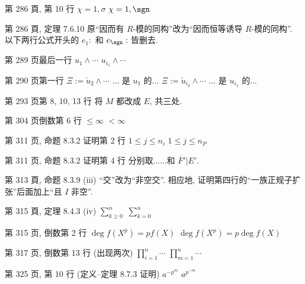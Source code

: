 \documentclass{AJerrata}
\begin{document}
\begin{Errata}
		\item[第 286 頁, 第 10 行]
		\Orig $\chi = 1, \sigma$
		\Corr $\chi = 1, \sgn$
		
		\item[第 286 頁, 定理 7.6.10]
		原``因而有 $R$-模的同构''改为``因而恒等诱导 $R$-模的同构''. 以下两行公式开头的 $e_1:$ 和 $e_{\sgn}: $ 皆删去.
		
		\item[第 289 页最后一行]
		\Orig $u_1 \wedge \cdots$
		\Corr $u_{i_1} \wedge \cdots$
		
		\item[第 290 页第一行]
		\Orig $\Xi := \check{u}_2 \wedge \cdots$ ... 是 $u_1$ 的...
		\Corr $\Xi := \check{u}_{i_2} \wedge \cdots$ ... 是 $u_{i_1}$ 的...
		
		\item[第 293 页第 8, 10, 13 行]
		将 $M$ 都改成 $E$, 共三处.
		
		\item[第 304 页倒数第 6 行]
		\Orig $\leq \infty$
		\Corr $< \infty$
        
        \item[第 311 页, 命题 8.3.2 证明第 2 行]
        \Orig $1 \leq j \leq n_i$
        \Corr $1 \leq j \leq n_P$
        
        \item[第 311 页, 命题 8.3.2 证明第 4 行]
        \Corr 分别取......和 $\overline{F}' | E'$.
        
  		\item[第 313 頁, 命题 8.3.9 (iii)]
  		``交''改为``非空交''. 相应地, 证明第四行的``一族正规子扩张''后面加上``且 $I$ 非空''.
        
   		\item[第 315 頁, 定理 8.4.3 (iv)]
        \Orig $\sum_{k \geq 0}^n$
        \Corr $\sum_{k=0}^n$

        \item[第 315 页, 倒数第 2 行]
        \Orig $\deg f(X^p) = pf(X)$
        \Corr $\deg f(X^p) = p \deg f(X)$
        
        \item[第 317 页, 倒数第 13 行]
        (出现两次)\;
        \Orig $\prod_{i=1}^n \cdots$
        \Corr $\prod_{m=1}^n \cdots$
        
        \item[第 325 页, 第 10 行 (定义--定理 8.7.3 证明)]
        \Orig $a^{-p^m}$
        \Corr $a^{p^{-m}}$
        

\end{Errata}
\end{document}
